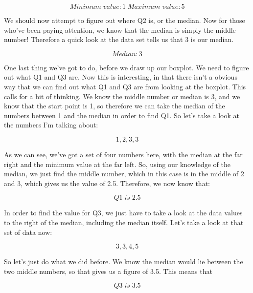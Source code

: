 \documentclass[11pt]{article}
\begin{document}
\begin{displaymath}
Minimum \; value: 1
\; Maximum \; value: 5
\end{displaymath}

We should now attempt to figure out where Q2 is, or the median. Now for those who've been paying attention, we know that the median is simply the middle number! Therefore a quick look at the data set tells us that 3 is our median. 

\begin{displaymath}
Median: 3
\end{displaymath}

One last thing we've got to do, before we draw up our boxplot. We need to figure out what Q1 and Q3 are. Now this is interesting, in that there isn't a obvious way that we can find out what Q1 and Q3 are from looking at the boxplot. This calls for a bit of thinking. We know the middle number or median is 3, and we know that the start point is 1, so therefore we can take the median of the numbers between 1 and the median in order to find Q1. So let's take a look at the numbers I'm talking about:

\begin{displaymath}
1, 2, 3, 3
\end{displaymath}

As we can see, we've got a set of four numbers here, with the median at the far right and the minimum value at the far left. So, using our knowledge of the median, we just find the middle number, which in this case is in the middle of 2 and 3, which gives us the value of 2.5. Therefore, we now know that:

\begin{displaymath}
Q1 \; is \; 2.5
\end{displaymath}

In order to find the value for Q3, we just have to take a look at the data values to the right of the median, including the median itself. Let's take a look at that set of data now:

\begin{displaymath}
3, 3, 4, 5
\end{displaymath}

So let's just do what we did before. We know the median would lie between the two middle numbers, so that gives us a figure of 3.5. This means that

\begin{displaymath}
Q3 \; is \; 3.5
\end{displaymath}
\end{document}
